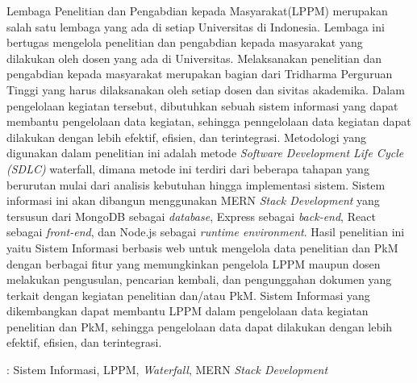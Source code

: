 Lembaga Penelitian dan Pengabdian kepada
Masyarakat(LPPM) merupakan salah satu lembaga yang ada di setiap Universitas di Indonesia.
Lembaga ini bertugas mengelola penelitian dan pengabdian kepada masyarakat yang dilakukan
oleh dosen yang ada di Universitas. Melaksanakan penelitian dan pengabdian kepada masyarakat
merupakan bagian dari Tridharma Perguruan Tinggi yang harus dilaksanakan oleh setiap dosen dan sivitas akademika.
Dalam pengelolaan kegiatan tersebut, dibutuhkan sebuah sistem informasi yang
dapat membantu pengelolaan data kegiatan, sehingga penngelolaan data kegiatan dapat
dilakukan dengan lebih efektif, efisien, dan terintegrasi.
Metodologi yang digunakan dalam penelitian ini adalah
metode \textit{Software Development Life Cycle \emph{(SDLC)}} waterfall, dimana metode ini 
terdiri dari beberapa tahapan yang berurutan mulai dari analisis kebutuhan hingga implementasi sistem.
Sistem informasi ini akan dibangun menggunakan MERN \textit{Stack Development} yang tersusun 
dari MongoDB sebagai \textit{database}, Express sebagai \textit{back-end}, React sebagai 
\textit{front-end}, dan Node.js sebagai \textit{runtime environment}.
Hasil penelitian ini yaitu Sistem Informasi berbasis web
untuk mengelola data penelitian dan PkM dengan berbagai fitur yang 
memungkinkan pengelola LPPM maupun dosen melakukan pengusulan, 
pencarian kembali, dan pengunggahan dokumen yang terkait dengan 
kegiatan penelitian dan/atau PkM.
Sistem Informasi yang dikembangkan dapat membantu LPPM dalam
pengelolaan data kegiatan penelitian dan PkM, sehingga pengelolaan data dapat
dilakukan dengan lebih efektif, efisien, dan terintegrasi.

 : Sistem Informasi, LPPM, \textit{Waterfall}, MERN \textit{Stack Development}

\vspace{1cm}



